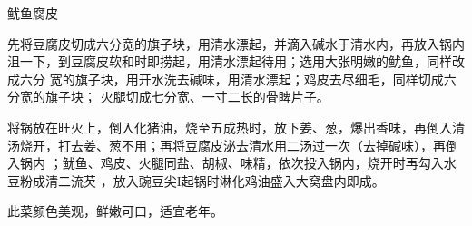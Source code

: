 \begin{recipe}{鱿鱼腐皮}

\ingredients


\cooking

\step 先将豆腐皮切成六分宽的旗子块，用清水漂起，并滴入碱水于清水内，再放入锅内
沮一下，到豆腐皮软和时即捞起，用清水漂起待用；选用大张明嫩的鱿鱼，同样改成六分
宽的旗子块，用开水洗去碱味，用清水漂起；鸡皮去尽细毛，同样切成六分宽的旗子块；
火腿切成七分宽、一寸二长的骨睥片子。

\step 将锅放在旺火上，倒入化猪油，烧至五成热时，放下姜、葱，爆出香味，再倒入清
汤烧开，打去姜、葱不用；再将豆腐皮泌去清水用二汤过一次（去掉碱味），再倒入锅内
；鱿鱼、鸡皮、火腿同盐、胡椒、味精，依次投入锅内，烧开时再勾入水豆粉成清二流芡
，放入豌豆尖I起锅时淋化鸡油盛入大窝盘内即成。

\notes

此菜颜色美观，鲜嫩可口，适宜老年。

\end{recipe}

